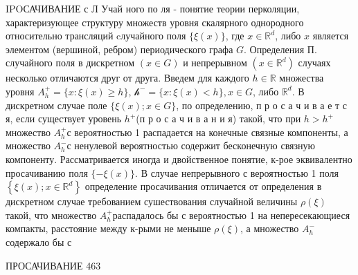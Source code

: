 \documentclass[10pt]{article}
\begin{document}
IPOСАЧИВАНИЕ с Л Учай ного по ля - понятие теории перколяции, характеризующее структуру множеств уровня скалярного однородного относительно трансляций cлучайного поля $\{\xi(x)\}$, где $x \in \mathbb{R}^{d}$, либо $x$ является элементом (вершиной, ребром) периодического графа $G$. Определения П. случайного поля в дискретном $(x \in G)$ и непрерывном $\left(x \in \mathbb{R}^{d}\right)$ случаях несколько отличаются друг от друга. Введем для каждого $h \in \mathbb{R}$ множества уровня $A_{h}^{+}=\{x: \xi(x) \geqslant h\}$, $\mathcal{h}^{-}=\{x: \xi(x)<h\}, x \in G$, либо $\mathbb{R}^{d}$. В дискретном случае поле $\{\xi(x) ; x \in G\}$, по определению, п р о с а ч и в а е т с я, если существует уровень $h^{+}$(п р о с а ч и в а н и я) такой, что при $h>h^{+}$множество $A_{h}^{+}$с вероятностью 1 распадается на конечные связные компоненты, а множество $A_{h}^{-}$с ненулевой вероятностью содержит бесконечную связную компоненту. Рассматривается иногда и двойственное понятие, к-рое эквивалентно просачиванию поля $\{-\xi(x)\}$. В случае непрерывного с вероятностью 1 поля $\left\{\xi(x) ; x \in \mathbb{R}^{d}\right\}$ определение просачивания отличается от определения в дискретном случае требованием сушествования случайной величины $\rho(\xi)$ такой, что множество $A_{h}^{+}$распадалось бы с вероятностью 1 на непересекающиеся компакты, расстояние между к-рыми не меныше $\rho(\xi)$, а множество $A_{h}^{-}$содержало бы с



ПРОСАЧИВАНИЕ 463
\end{document}
